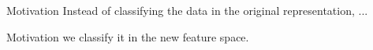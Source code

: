 \documentclass[11pt,compress,t,notes=noshow]{beamer}
\begin{document}
\begin{frame} {Motivation}
  \small{Instead of classifying the data in the original representation, ...}
    \begin{figure}
    \centering
  \end{figure}
\end{frame}

\begin{frame} {Motivation}
   \small{we classify it in the new feature space.}
  \begin{figure}
    \centering
  \end{figure}
\end{frame}
\end{document}
